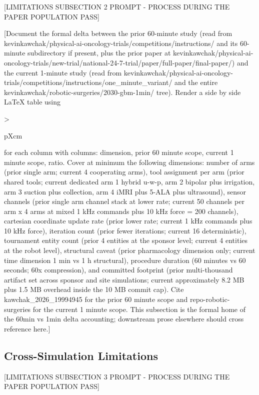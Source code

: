 [LIMITATIONS SUBSECTION 2 PROMPT - PROCESS DURING THE PAPER POPULATION PASS]

[Document the formal delta between the prior 60-minute study (read
from
kevinkawchak/physical-ai-oncology-trials/competitions/instructions/
and its 60-minute subdirectory if present, plus the prior paper at
kevinkawchak/physical-ai-oncology-trials/new-trial/national-24-7-trial/paper/full-paper/final-paper/)
and the current 1-minute study (read from
kevinkawchak/physical-ai-oncology-trials/competitions/instructions/one_minute_variant/
and the entire kevinkawchak/robotic-surgeries/2030-gbm-1min/ tree).
Render a side by side LaTeX table using
{>{\raggedright\arraybackslash}p{Xcm}} for each column with columns:
dimension, prior 60 minute scope, current 1 minute scope, ratio.
Cover at minimum the following dimensions: number of arms (prior
single arm; current 4 cooperating arms), tool assignment per arm
(prior shared tools; current dedicated arm 1 hybrid u-w-p, arm 2
bipolar plus irrigation, arm 3 suction plus collection, arm 4 iMRI
plus 5-ALA plus ultrasound), sensor channels (prior single arm
channel stack at lower rate; current 50 channels per arm x 4 arms
at mixed 1 kHz commands plus 10 kHz force = 200 channels), cartesian
coordinate update rate (prior lower rate; current 1 kHz commands
plus 10 kHz force), iteration count (prior fewer iterations; current
16 deterministic), tournament entity count (prior 4 entities at the
sponsor level; current 4 entities at the robot level), structural
caveat (prior pharmacology dimension only; current time dimension
1 min vs 1 h structural), procedure duration (60 minutes vs 60
seconds; 60x compression), and committed footprint (prior
multi-thousand artifact set across sponsor and site simulations;
current approximately 8.2 MB plus 1.5 MB overhead inside the 10 MB
commit cap). Cite kawchak_2026_19994945 for the prior 60 minute
scope and repo-robotic-surgeries for the current 1 minute scope.
This subsection is the formal home of the 60min vs 1min delta
accounting; downstream prose elsewhere should cross reference here.]

\subsection{Cross-Simulation Limitations}
\label{sec:limits-cross}

[LIMITATIONS SUBSECTION 3 PROMPT - PROCESS DURING THE PAPER POPULATION PASS]

